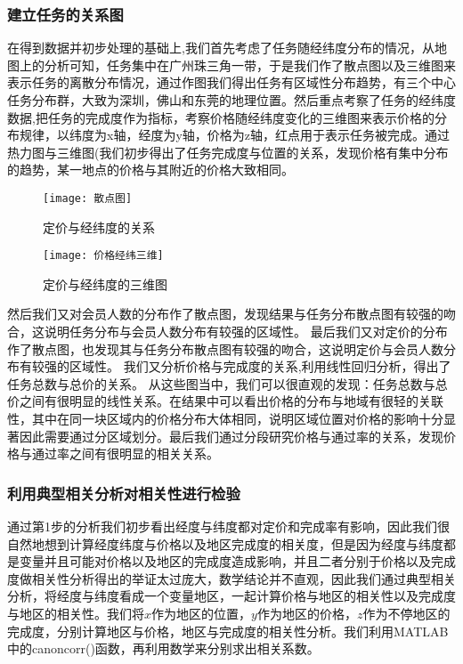 \documentclass{ctexart}
\begin{document}
\subsubsection{建立任务的关系图}
在得到数据并初步处理的基础上,我们首先考虑了任务随经纬度分布的情况，从地图上的分析可知，任务集中在广州珠三角一带，于是我们作了散点图以及三维图来表示任务的离散分布情况，通过作图我们得出任务有区域性分布趋势，有三个中心任务分布群，大致为深圳，佛山和东莞的地理位置。然后重点考察了任务的经纬度数据,把任务的完成度作为指标，考察价格随经纬度变化的三维图来表示价格的分布规律，以纬度为x轴，经度为y轴，价格为z轴，红点用于表示任务被完成。通过热力图与三维图(我们初步得出了任务完成度与位置的关系，发现价格有集中分布的趋势，某一地点的价格与其附近的价格大致相同。
\begin{figure}[htbp] 
\centering
\texttt{[image: 散点图]} 
\caption{定价与经纬度的关系}
\end{figure}
\begin{figure}[htbp] 
\centering
\texttt{[image: 价格经纬三维]} 
\caption{定价与经纬度的三维图}
\end{figure}

然后我们又对会员人数的分布作了散点图，发现结果与任务分布散点图有较强的吻合，这说明任务分布与会员人数分布有较强的区域性。
最后我们又对定价的分布作了散点图，也发现其与任务分布散点图有较强的吻合，这说明定价与会员人数分布有较强的区域性。
我们又分析价格与完成度的关系,利用线性回归分析，得出了任务总数与总价的关系。
从这些图当中，我们可以很直观的发现：任务总数与总价之间有很明显的线性关系。在结果中可以看出价格的分布与地域有很轻的关联性，其中在同一块区域内的价格分布大体相同，说明区域位置对价格的影响十分显著因此需要通过分区域划分。最后我们通过分段研究价格与通过率的关系，发现价格与通过率之间有很明显的相关关系。

\subsubsection{利用典型相关分析对相关性进行检验}
通过第1步的分析我们初步看出经度与纬度都对定价和完成率有影响，因此我们很自然地想到计算经度纬度与价格以及地区完成度的相关度，但是因为经度与纬度都是变量并且可能对价格以及地区的完成度造成影响，并且二者分别于价格以及完成度做相关性分析得出的举证太过庞大，数学结论并不直观，因此我们通过典型相关分析，将经度与纬度看成一个变量地区，一起计算价格与地区的相关性以及完成度与地区的相关性。我们将$x$作为地区的位置，$y$作为地区的价格，$z$作为不停地区的完成度，分别计算地区与价格，地区与完成度的相关性分析。我们利用MATLAB中的canoncorr()函数，再利用数学来分别求出相关系数。
\end{document}
